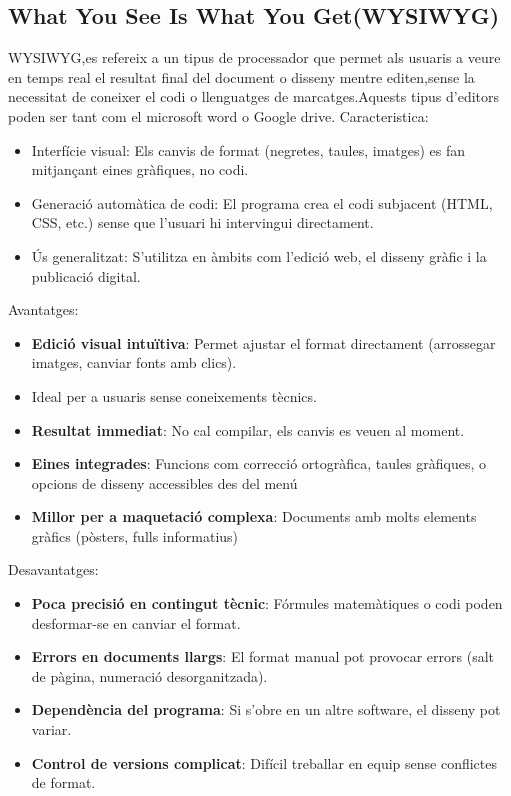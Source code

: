 \subsection{What You See Is What You Get(WYSIWYG)}
WYSIWYG,es refereix a un tipus de processador que permet als usuaris a veure en temps real el resultat final del document o disseny mentre editen,sense la necessitat de coneixer el codi o llenguatges de marcatges.Aquests tipus d'editors poden ser tant com el microsoft word o Google drive.
Caracteristica:
\begin{itemize}
 \item Interfície visual: Els canvis de format (negretes, taules, imatges) es fan mitjançant eines gràfiques, no codi.
 \item Generació automàtica de codi: El programa crea el codi subjacent (HTML, CSS, etc.) sense que l'usuari hi intervingui directament.
 \item Ús generalitzat: S'utilitza en àmbits com l'edició web, el disseny gràfic i la publicació digital.
\end{itemize}
Avantatges:
\begin{itemize}
\item \textbf{Edició visual intuïtiva}: Permet ajustar el format directament (arrossegar imatges, canviar fonts amb clics).
 \item Ideal per a usuaris sense coneixements tècnics.
\item \textbf{Resultat immediat}: No cal compilar, els canvis es veuen al moment.
\item \textbf{Eines integrades}: Funcions com correcció ortogràfica, taules gràfiques, o opcions de disseny accessibles des del menú
\item \textbf{Millor per a maquetació complexa}: Documents amb molts elements gràfics (pòsters, fulls informatius)
\end{itemize}
Desavantatges:
\begin{itemize}
 \item \textbf{Poca precisió en contingut tècnic}: Fórmules matemàtiques o codi poden desformar-se en canviar el format.
 \item \textbf{Errors en documents llargs}: El format manual pot provocar errors (salt de pàgina, numeració desorganitzada).
 \item \textbf{ Dependència del programa}: Si s'obre en un altre software, el disseny pot variar.
 \item \textbf{Control de versions complicat}: Difícil treballar en equip sense conflictes de format.
\end{itemize}

